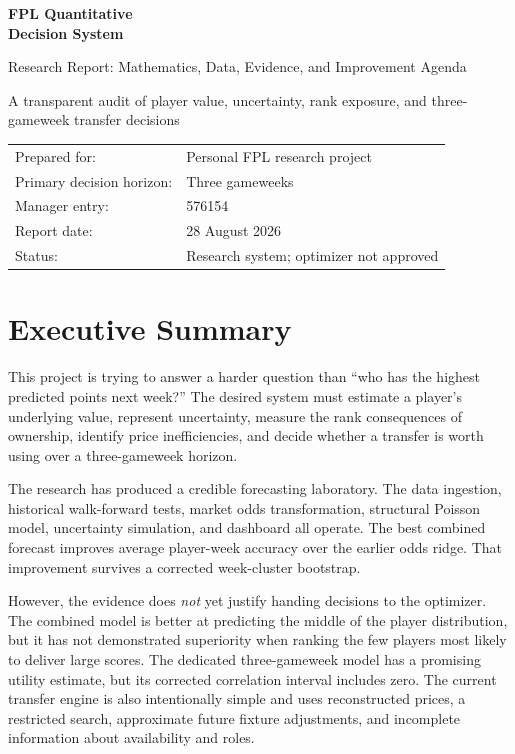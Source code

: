 \documentclass[11pt,a4paper]{article}
\begin{document}
\begin{titlepage}
\pagecolor{Navy}
\color{white}
\vspace*{22mm}
{\Huge\bfseries FPL Quantitative\\Decision System\par}
\vspace{8mm}
{\LARGE Research Report: Mathematics, Data, Evidence, and Improvement Agenda\par}
\vspace{18mm}
{\large A transparent audit of player value, uncertainty, rank exposure, and three-gameweek transfer decisions\par}
\vfill
\begin{tabular}{@{}ll@{}}
Prepared for: & Personal FPL research project\\
Primary decision horizon: & Three gameweeks\\
Manager entry: & 576154\\
Report date: & 28 August 2026\\
Status: & Research system; optimizer not approved\\
\end{tabular}
\vspace{18mm}
\end{titlepage}
\nopagecolor
\color{black}

\tableofcontents
\clearpage
{}

\section{Executive Summary}

This project is trying to answer a harder question than ``who has the highest predicted points next week?'' The desired system must estimate a player's underlying value, represent uncertainty, measure the rank consequences of ownership, identify price inefficiencies, and decide whether a transfer is worth using over a three-gameweek horizon.

The research has produced a credible forecasting laboratory. The data ingestion, historical walk-forward tests, market odds transformation, structural Poisson model, uncertainty simulation, and dashboard all operate. The best combined forecast improves average player-week accuracy over the earlier odds ridge. That improvement survives a corrected week-cluster bootstrap.

However, the evidence does \emph{not} yet justify handing decisions to the optimizer. The combined model is better at predicting the middle of the player distribution, but it has not demonstrated superiority when ranking the few players most likely to deliver large scores. The dedicated three-gameweek model has a promising utility estimate, but its corrected correlation interval includes zero. The current transfer engine is also intentionally simple and uses reconstructed prices, a restricted search, approximate future fixture adjustments, and incomplete information about availability and roles.
\end{document}
